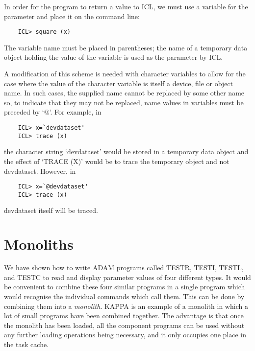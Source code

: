 In order for the program to return a value to ICL, we must use a variable for
the parameter and place it on the command line:

\begin{small}
\begin{verbatim}
    ICL> square (x)
\end{verbatim}
\end{small}

The variable name must be placed in parentheses; the name of a temporary
data object holding the value of the variable is used as the parameter by ICL.

A modification of this scheme is needed with character variables to allow for
the case where the value of the character variable is itself a device, file
or object name.
In such cases, the supplied name cannot be replaced by some other name so,
to indicate that they may not be replaced, name values in variables must be
preceded by `@'.
For example, in

\begin{small}
\begin{verbatim}
    ICL> x=`devdataset'
    ICL> trace (x)
\end{verbatim}
\end{small}

the character string `devdataset' would be stored in a temporary data object
and the effect of `TRACE (X)' would be to trace the temporary object and not
devdataset.
However, in

\begin{small}
\begin{verbatim}
    ICL> x=`@devdataset'
    ICL> trace (x)
\end{verbatim}
\end{small}

devdataset itself will be traced.

\section{Monoliths}
\label{S_Mono}

We have shown how to write ADAM programs called TESTR, TESTI, TESTL, and TESTC
to read and display parameter values of four different types.
It would be convenient to combine these four similar programs in a single
program which would recognise the individual commands which call them.
This can be done by combining them into a {\em monolith}.
KAPPA is an example of a monolith in which a lot of small programs have been
combined together.
The advantage is that once the monolith has been loaded, all the component
programs can be used without any further loading operations being necessary,
and it only occupies one place in the task cache.

